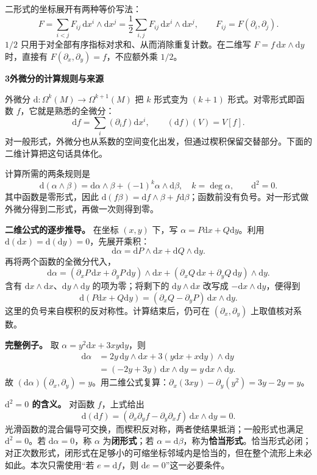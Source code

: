 \documentclass[11pt,a4paper]{article}
\newcommand{\D}{\mathrm d}
\begin{document}
\newpage
二形式的坐标展开有两种等价写法：
\[
 F=\sum_{i<j}F_{ij}\,\D x^i\wedge\D x^j
   =\frac12\sum_{i,j}F_{ij}\,\D x^i\wedge\D x^j,
 \qquad F_{ij}=F(\partial_i,\partial_j).
\]
$1/2$ 只用于对全部有序指标对求和、从而消除重复计数。在二维写 $F=f\,\D x\wedge\D y$ 时，直接有 $F(\partial_x,\partial_y)=f$，不应额外乘 $1/2$。

\textbf{3\quad 外微分的计算规则与来源}

外微分 $\D:\Omega^k(M)\to\Omega^{k+1}(M)$ 把 $k$ 形式变为 $(k+1)$ 形式。对零形式即函数 $f$，它就是熟悉的全微分：
\[
 \D f=\sum_i(\partial_i f)\D x^i,
 \qquad (\D f)(V)=V[f].
\]
对一般形式，外微分也从系数的空间变化出发，但通过楔积保留交替部分。下面的二维计算把这句话具体化。

计算所需的两条规则是
\[
 \D(\alpha\wedge\beta)
 =\D\alpha\wedge\beta+(-1)^k\alpha\wedge\D\beta,
 \quad k=\deg\alpha,
 \qquad \D^2=0.
\]
其中函数是零形式，因此 $\D(f\beta)=\D f\wedge\beta+f\D\beta$；函数前没有负号。对一形式做外微分得到二形式，再做一次则得到零。

\textbf{二维公式的逐步推导。} 在坐标 $(x,y)$ 下，写 $\alpha=P\D x+Q\D y$。利用 $\D(\D x)=\D(\D y)=0$，先展开乘积：
\[
 \D\alpha=\D P\wedge\D x+\D Q\wedge\D y.
\]
再将两个函数的全微分代入，
\[
 \D\alpha=(\partial_xP\,\D x+\partial_yP\,\D y)\wedge\D x
 +(\partial_xQ\,\D x+\partial_yQ\,\D y)\wedge\D y.
\]
含有 $\D x\wedge\D x$、$\D y\wedge\D y$ 的项为零；将剩下的 $\D y\wedge\D x$ 改写成 $-\D x\wedge\D y$，便得到
\[
 \boxed{\D(P\D x+Q\D y)=(\partial_xQ-\partial_yP)\,\D x\wedge\D y.}
\]
这里的负号来自楔积的反对称性。计算结束后，仍可在 $(\partial_x,\partial_y)$ 上取值核对系数。

\textbf{完整例子。} 取 $\alpha=y^2\D x+3xy\D y$，则
\[
\begin{aligned}
 \D\alpha
 &=2y\,\D y\wedge\D x+3(y\D x+x\D y)\wedge\D y\\
 &=(-2y+3y)\,\D x\wedge\D y
 =y\,\D x\wedge\D y.
\end{aligned}
\]
故 $(\D\alpha)(\partial_x,\partial_y)=y$。用二维公式复算：$\partial_x(3xy)-\partial_y(y^2)=3y-2y=y$。

\textbf{$\D^2=0$ 的含义。} 对函数 $f$，上式给出
\[
 \D(\D f)=(\partial_x\partial_yf-\partial_y\partial_xf)\,
 \D x\wedge\D y=0.
\]
光滑函数的混合偏导可交换，而楔积反对称，两者使结果抵消；一般形式也满足 $\D^2=0$。若 $\D\alpha=0$，称 $\alpha$ 为\textbf{闭形式}；若 $\alpha=\D\beta$，称为\textbf{恰当形式}。恰当形式必闭；对正次数形式，闭形式在足够小的可缩坐标邻域内是恰当的，但在整个流形上未必如此。本次只需使用“若 $e=\D f$，则 $\D e=0$”这一必要条件。
\end{document}
